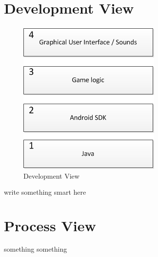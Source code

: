 \section{Development View}
\begin{figure}[h]
	\includegraphics[width=\textwidth]{DevelopmentView.png}
	\caption{Development View}
	\label{fig:DevelopmentView}
\end{figure}

write something smart here

\section{Process View}
something something